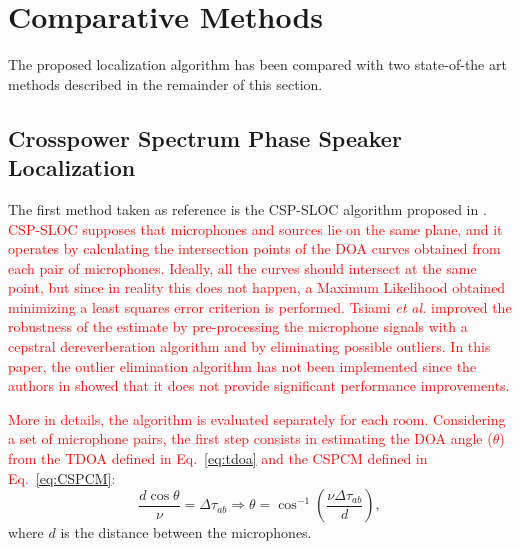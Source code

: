 \documentclass[review]{elsarticle}
\let\originaleqref=\eqref
\renewcommand{\eqref}{Eq.~\originaleqref}
\begin{document}
\section{Comparative Methods}
\label{sec:comp_meth}
The proposed localization algorithm has been compared with two state-of-the art methods described in the remainder of this section.

\subsection{Crosspower Spectrum Phase Speaker Localization}\label{sec:soa_met}
The first method taken as reference is the CSP-SLOC algorithm proposed in  \cite{tsiami2014experiments}. \textcolor{red}{CSP-SLOC supposes that microphones and sources lie on the same plane, and it operates by calculating the intersection points of the DOA curves obtained from each pair of microphones. Ideally, all the curves should intersect at the same point, but since in reality this does not happen, a Maximum Likelihood obtained minimizing a least squares error criterion is performed. Tsiami \textit{et al.} \cite{tsiami2014experiments} improved the robustness of the estimate by pre-processing the microphone signals with a cepstral dereverberation algorithm  and by eliminating possible outliers. In this paper, the outlier elimination algorithm has not been implemented since  the authors in \cite{tsiami2014experiments} showed that it does not provide significant performance improvements.}

\textcolor{red}{More in details, the algorithm is evaluated separately for each room. Considering a set of microphone pairs, the first step consists in 
estimating the DOA angle ($\theta$) from the TDOA defined in \eqref{eq:tdoa} and the CSPCM defined in \eqref{eq:CSPCM}:}
\begin{equation}\label{eq:doa}
\frac{d \cos \theta}{\nu} = \Delta\tau_{ab}  \Rightarrow \theta = \cos^{-1}  \left( \frac{\nu \Delta\tau_{ab} }{d} \right), 
\end{equation}
where $d$ is the distance between the microphones.
\end{document}
